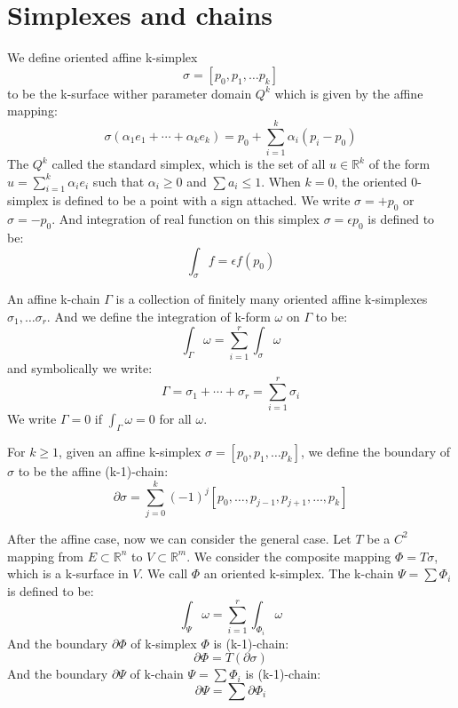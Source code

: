 \section{Simplexes and chains}
We define oriented affine k-simplex 
\begin{equation*}
    \sigma=[p_0,p_1,\dots p_k]
\end{equation*}
to be the k-surface wither parameter domain $Q^k$ which is given by the affine mapping:
\begin{equation*}
    \sigma(\alpha_1e_1+\cdots+\alpha_ke_k)=p_0+\sum_{i=1}^k\alpha_i(p_i-p_0)
\end{equation*}
The $Q^k$ called the standard simplex, which is the set of all $u\in \mathbb{R}^k$ of the form $u=\sum_{i=1}^k\alpha_ie_i$ such that $\alpha_i\geq 0$ and $\sum a_i\leq 1$. When $k=0$, the oriented 0-simplex is defined to be a point with a sign attached. We write $\sigma=+p_0$ or $\sigma=-p_0$. And integration of real function on this simplex $\sigma=\epsilon p_0$ is defined to be:
\begin{equation*}
    \int_{\sigma}f=\epsilon f(p_0)
\end{equation*}\par
An affine k-chain $\Gamma$ is a collection of finitely many oriented affine k-simplexes $\sigma_1,\dots \sigma_r$. And we define the integration of k-form $\omega$ on $\Gamma$ to be:
\begin{equation*}
    \int_{\Gamma}\omega=\sum_{i=1}^r\int_{\sigma}\omega
\end{equation*}
and symbolically we write:
\begin{equation*}
    \Gamma=\sigma_1+\cdots+\sigma_r=\sum_{i=1}^r\sigma_i
\end{equation*}
We write $\Gamma=0$ if $\int_{\Gamma}\omega=0$ for all $\omega$.\par
For $k\geq 1$, given an affine k-simplex $\sigma=[p_0,p_1,\dots p_k]$, we define the boundary of $\sigma$ to be the affine (k-1)-chain:
\begin{equation*}
    \partial \sigma=\sum_{j=0}^k(-1)^j[p_0,\dots,p_{j-1},p_{j+1},\dots, p_k]
\end{equation*}\par
After the affine case, now we can consider the general case. Let $T$ be a $C^2$ mapping from $E\subset \mathbb{R}^n$ to $V\subset \mathbb{R}^m$. We consider the composite mapping $\Phi=T\sigma$, which is a k-surface in $V$. We call $\Phi$ an oriented k-simplex. The k-chain $\Psi=\sum \Phi_i$ is defined to be:
\begin{equation*}
    \int_{\Psi}{\omega}=\sum_{i=1}^r\int_{\Phi_i}{\omega}
\end{equation*}
And the boundary $\partial\Phi$ of k-simplex $\Phi$ is (k-1)-chain:
\begin{equation*}
    \partial\Phi=T(\partial\sigma)
\end{equation*}
And the boundary $\partial\Psi$ of k-chain $\Psi=\sum \Phi_i$ is (k-1)-chain:
\begin{equation*}
    \partial\Psi=\sum\partial\Phi_i
\end{equation*}
